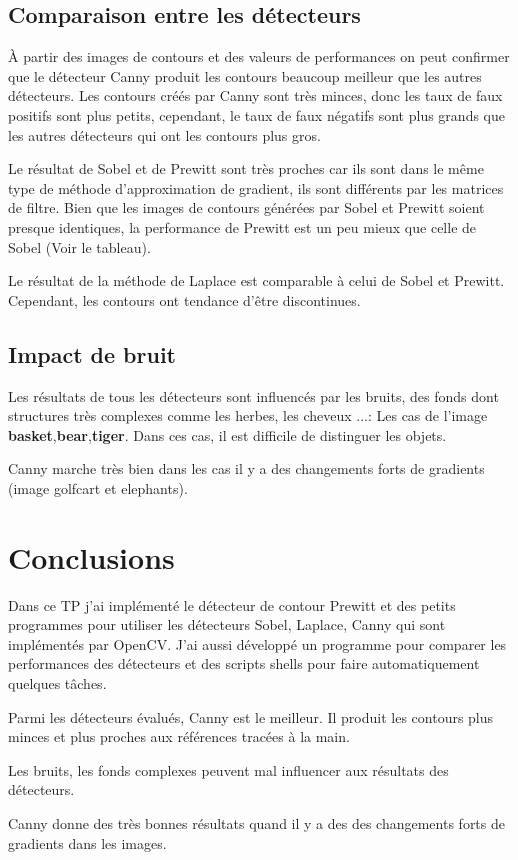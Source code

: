 \documentclass[article=a4, fontsize=11pt]{scrartcl}	%
\begin{document}
\subsection{Comparaison entre les détecteurs}
À partir des images de contours et des valeurs de performances on peut confirmer que le détecteur Canny produit les contours beaucoup meilleur que les autres détecteurs. Les contours créés par Canny sont très minces, donc les taux de faux positifs sont plus petits, cependant, le taux de faux négatifs sont plus grands que les autres détecteurs qui ont les contours plus gros. 

Le résultat de Sobel et de Prewitt sont très proches car ils sont dans le même type de méthode d'approximation de gradient, ils sont différents par les matrices de filtre. Bien que les images de contours générées par Sobel et Prewitt soient presque identiques, la performance de Prewitt est un peu mieux que celle de Sobel (Voir le tableau).

Le résultat de la méthode de Laplace est comparable à celui de Sobel et Prewitt. Cependant, les contours ont tendance d'être discontinues.

\subsection{Impact de bruit}
Les résultats de tous les détecteurs sont influencés par les bruits, des fonds dont structures très complexes comme les herbes, les cheveux ...: Les cas de l'image \textbf{basket},\textbf{bear},\textbf{tiger}. Dans ces cas, il est difficile de distinguer les objets.

Canny marche très bien dans les cas il y a des changements forts de gradients (image golfcart et elephants).

\section{Conclusions}
Dans ce TP j’ai implémenté le détecteur de contour Prewitt et des petits programmes pour utiliser les détecteurs Sobel, Laplace, Canny qui sont implémentés par OpenCV. J'ai aussi développé un programme pour comparer les performances des détecteurs et des scripts shells pour faire automatiquement quelques tâches.

Parmi les détecteurs évalués, Canny est le meilleur. Il produit les contours plus minces et plus proches aux références tracées à la main.

Les bruits, les fonds complexes peuvent mal influencer aux résultats des détecteurs.

Canny donne des très bonnes résultats quand il y a des des changements forts de gradients dans les images.
\end{document}
